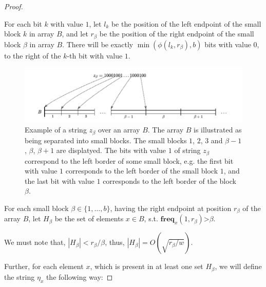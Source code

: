 \documentclass[runningheads]{llncs}
\begin{document}
\begin{proof}
\begin{definition}
        \begin{property}
            For each bit $k$ with value $1$, let $l_k$ be the position of the left endpoint of the small block $k$ in array $B$, and let $r_{\beta}$ 
            be the position of the right endpoint of the small block $\beta$ in array $B$. 
            There will be exactly $\min(\phi(l_k,r_{\beta}) , b )$ bits with value $0$, to the right of the $k$-th bit with value $1$.
        \end{property}

    \end{definition}

    \begin{figure}[H]
        \centering
        \hspace*{-1cm}      
        \includegraphics[scale=1]{figures/example_figure5.pdf}
        \caption{
            Example of a string $z_{\beta}$ over an array $B$. The array $B$ is illustrated as being separated into small blocks.
            The small blocks $1$, $2$, $3$ and $\beta-1$, $\beta$, $\beta+1$ are displatyed.
            The bits with value $1$ of string $z_{\beta}$ correspond to the left border of some small block, 
            e.g. the first bit with value $1$ corresponds to the left border of the small block $1$, 
            and the last bit with value $1$ corresponds to the left border of the block $\beta$. 
            }
        \label{fig:fig5}
    \end{figure}


    \begin{definition}
        For each small block $\beta \in \{1, \dots, b\}$, having the right endpoint at position $r_{\beta}$ of the array $B$, let $H_\beta$ be the set of elements $x\in B$, s.t. $\textbf{freq}_x(1,r_{\beta})$>$\beta$.
    \end{definition}

    We must note that, $|H_{\beta}|<r_{\beta}/\beta$, thus, $|H_{\beta}|=O(\sqrt{r_{\beta}/w})$.

    Further, for each element $x$, which is present in at least one set $H_{\beta}$, we will define the string $\eta_{x}$ the following way:


\end{proof}
\end{document}
